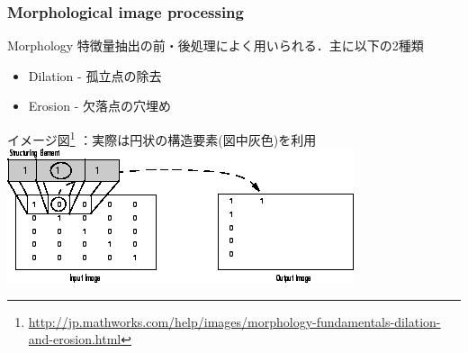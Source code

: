 

\begin{frame}\frametitle{Morphological image processing}
\begin{block}{Morphology}
特徴量抽出の前・後処理によく用いられる．主に以下の2種類
\begin{itemize}
    \item Dilation - 孤立点の除去
    \item Erosion - 欠落点の穴埋め
\end{itemize}
\end{block}

イメージ図\footnote
{\url{http://jp.mathworks.com/help/images/morphology-fundamentals-dilation-and-erosion.html}}
：実際は円状の構造要素(図中灰色)を利用
\includegraphics[scale=0.4]{figure/morph.png}
\end{frame}
